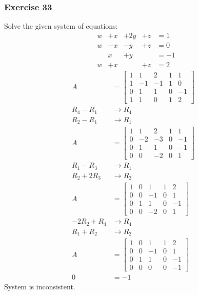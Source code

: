 \documentclass[letterpaper, 12pt]{math}
\begin{document}
\subsubsection*{Exercise 33}
Solve the given system of equations:
\[ \begin{alignedat}{5}
  &w &+x &+2y &+z &= 1 \\
  &w &-x &-y  &+z &= 0 \\
  &  &x  &+y  &   &= -1 \\
  &w &+x &    &+z &= 2
\end{alignedat} \]
\begin{align*}
  A &= \begin{bmatrix}
    1 & 1 & 2 & 1 & 1 \\
    1 & -1 & -1 & 1 & 0 \\
    0 & 1 & 1 & 0 & -1 \\
    1 & 1 & 0 & 1 & 2
  \end{bmatrix} \\
  R_4-R_1 &\to R_4 \\
  R_2-R_1 &\to R_1 \\
  A &= \begin{bmatrix}
    1 & 1 & 2 & 1 & 1 \\
    0 & -2 & -3 & 0 & -1 \\
    0 & 1 & 1 & 0 & -1 \\
    0 & 0 & -2 & 0 & 1
  \end{bmatrix} \\
  R_1-R_3 &\to R_1 \\
  R_2+2R_3 &\to R_2 \\
  A &= \begin{bmatrix}
    1 & 0 & 1 & 1 & 2 \\
    0 & 0 & -1 & 0 & 1 \\
    0 & 1 & 1 & 0 & -1 \\
    0 & 0 & -2 & 0 & 1
  \end{bmatrix} \\
  -2R_2+R_4 &\to R_4 \\
  R_1+R_2 &\to R_2 \\
  A &= \begin{bmatrix}
    1 & 0 & 1 & 1 & 2 \\
    0 & 0 & -1 & 0 & 1 \\
    0 & 1 & 1 & 0 & -1 \\
    0 & 0 & 0 & 0 & -1
  \end{bmatrix} \\
  0 &= -1
\end{align*}
System is inconsistent.
\end{document}
